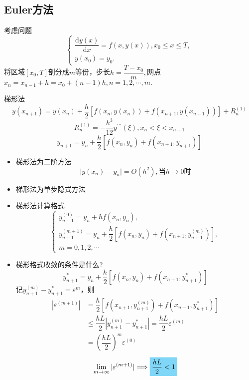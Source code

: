 \subsection{Euler方法}
\begin{definition}[Euler方法]
    考虑问题
    \[
        \begin{cases}
            \dfrac{\mathrm{d}y(x)}{\mathrm{d}x}=f(x,y(x)),x_0\leq x\leq T,\\
            y(x_0)=y_0.
        \end{cases}
    \]
    将区域$\left[ x_0,T \right]$剖分成$m$等份，步长$h = \dfrac{T-x_0}{m},$网点$x_{n}=x_{n-1}+h=x_{0}+(n-1)h,n=1,2,\cdots,m.$
\end{definition}

\begin{note}
    梯形法
    \[
        y(x_{n+1})=y(x_{n})+\frac{h}{2}[f(x_{n},y(x_{n}))+f(x_{n+1},y(x_{n+1}))]+R_{n}^{(1)}
    \]
    \[
        R_{n}^{(1)}=-\frac{h^{3}}{12}y^{\prime\prime\prime}(\xi),x_{n}<\xi<x_{n+1}
    \]
    \[
        y_{n+1}=y_{n}+\frac{h}{2}[f(x_{n},y_{n})+f(x_{n+1},y_{n+1})]
    \]
    \begin{itemize}
        \item 梯形法为二阶方法
        \[
            \mid y(x_n)-y_n\mid=O(h^2),\text{当}h\to 0\text{时}  
        \]
        \item 梯形法为单步隐式方法
        \item 梯形法计算格式
        \[
            \begin{cases}
                y_{n+1}^{(0)}=y_{n}+hf(x_{n},y_{n}),\\
                y_{n+1}^{(m+1)}=y_{n}+\dfrac{h}{2}[f(x_{n},y_{n})+f(x_{n+1},y_{n+1}^{(m)})],\\
                m=0,1,2,\cdots
            \end{cases}
        \]
        \item \colorbox{cyan!50}{梯形格式收敛的条件}是什么?
        \[    
            y_{n+1}^{*} = y_n+\dfrac{h}{2}\left[ f(x_n,y_n)+f(x_{n+1},y_{n+1}^{*}) \right]
        \]
        记$y_{n+1}^{(m)}-y_{n+1}^{*} = \varepsilon^{m}$，则
        \[
            \begin{aligned}
                |\varepsilon^{(m+1)}| &= \dfrac{h}{2}\left[ f(x_{n+1},y_{n+1}^{(m)})+f(x_{n+1},y_{n+1}^{*}) \right]\\
                &\leqslant \dfrac{hL}{2}|y_{n+1}^{(m)}-y_{n+1}^{*}| = \dfrac{hL}{2}\varepsilon^{(m)}\\
                &=\left( \dfrac{hL}{2} \right)^{m}\varepsilon^{(0)}
            \end{aligned}
        \]
        \[
            \lim_{m\to \infty}|\varepsilon^{(m+1)}|\Longrightarrow\colorbox{cyan!50}{$\dfrac{hL}{2}<1$}
        \]
    \end{itemize}
\end{note}
